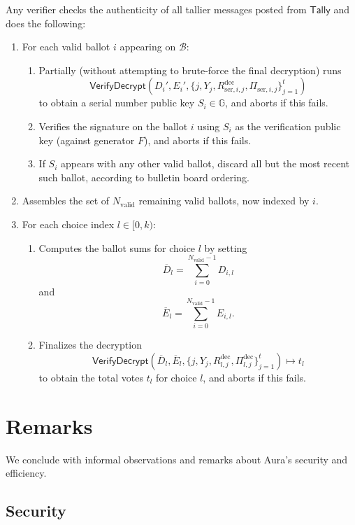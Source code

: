 \documentclass{article}
\newcommand{\G}{\mathbb{G}}
\newcommand{\func}[1]{\mathsf{#1}}
\begin{document}
Any verifier checks the authenticity of all tallier messages posted from $\func{Tally}$ and does the following:
\begin{enumerate}
    \item For each valid ballot $i$ appearing on $\mathcal{B}$:
    \begin{enumerate}
        \item Partially (without attempting to brute-force the final decryption) runs $$\func{VerifyDecrypt}(D_i', E_i', \{j, Y_j, R_{\text{ser},i,j}^{\text{dec}}, \Pi_{\text{ser},i,j}\}_{j=1}^t)$$ to obtain a serial number public key $S_i \in \G$, and aborts if this fails.
        \item Verifies the signature on the ballot $i$ using $S_i$ as the verification public key (against generator $F$), and aborts if this fails.
        \item If $S_i$ appears with any other valid ballot, discard all but the most recent such ballot, according to bulletin board ordering.
    \end{enumerate}
    \item Assembles the set of $N_{\text{valid}}$ remaining valid ballots, now indexed by $i$.
    \item For each choice index $l \in [0,k)$:
    \begin{enumerate}
        \item Computes the ballot sums for choice $l$ by setting $$\overline{D}_l = \sum_{i=0}^{N_{\text{valid}}-1} D_{i,l}$$ and $$\overline{E}_l = \sum_{i=0}^{N_{\text{valid}}-1} E_{i,l}.$$
        \item Finalizes the decryption $$\func{VerifyDecrypt}(\overline{D}_l, \overline{E}_l, \{j, Y_j, R_{l,j}^{\text{dec}}, \Pi_{l,j}^{\text{dec}}\}_{j=1}^t) \mapsto t_l$$ to obtain the total votes $t_l$ for choice $l$, and aborts if this fails.
    \end{enumerate}
\end{enumerate}


\section{Remarks}

We conclude with informal observations and remarks about Aura's security and efficiency.

\subsection{Security}
\end{document}

